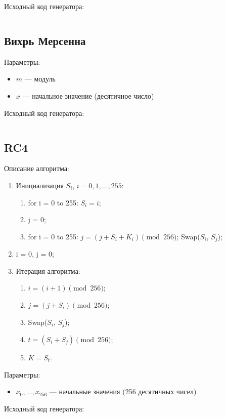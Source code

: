 \documentclass[spec, och, pract_otchet]{SCWorks}
\begin{document}
Исходный код генератора:
\inputminted{rust}{../prng/src/nfsr.rs}

\subsection{Вихрь Мерсенна}

Параметры:
\begin{itemize}
  \item $m$ --- модуль
  \item $x$ --- начальное значение (десятичное число)
\end{itemize}

Исходный код генератора:
\inputminted{rust}{../prng/src/mersenne.rs}

\subsection{RC4}

Описание алгоритма:
\begin{enumerate}
  \item
    Инициализация $S_i$, $i = 0, 1, \dots, 255$:
    \begin{enumerate}
      \item for i = 0 to 255: $S_i = i$;
      \item j = 0;
      \item for i = 0 to 255: $j = (j + S_i + K_i) \pmod{256}$; Swap($S_i$, $S_j$);
    \end{enumerate}
  \item i = 0, j = 0;
  \item
    Итерация алгоритма:
    \begin{enumerate}
      \item $i = (i + 1) \pmod{256}$;
      \item $j = (j + S_i) \pmod{256}$;
      \item Swap($S_i$, $S_j$);
      \item $t = (S_i + S_j) \pmod{256}$;
      \item $K = S_t$.
    \end{enumerate}
\end{enumerate}

Параметры:
\begin{itemize}
  \item $x_0,\dots,x_{256}$ --- начальные значения (256 десятичных чисел)
\end{itemize}

Исходный код генератора:
\inputminted{rust}{../prng/src/rc4.rs}
\end{document}
